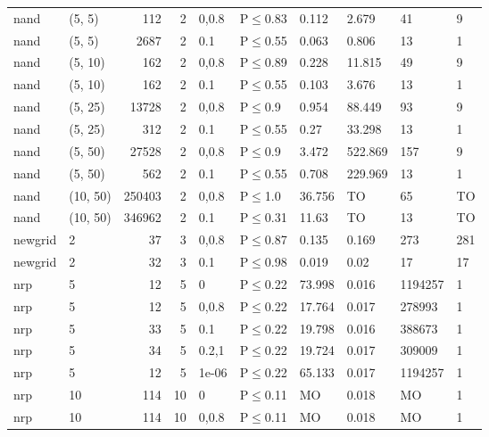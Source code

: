 \begin{longtable}{llrrllllll}
 nand          & (5, 5)   &    	112 &   2 & 0,0.8 & P$\leq$0.83  & 0.112  & 2.679   & 41      & 9    \\
 nand          & (5, 5)   &   	2687 &   2 & 0.1   & P$\leq$0.55  & 0.063  & 0.806   & 13      & 1    \\
 nand          & (5, 10)  &    	162 &   2 & 0,0.8 & P$\leq$0.89  & 0.228  & 11.815  & 49      & 9    \\
 nand          & (5, 10)  &    	162 &   2 & 0.1   & P$\leq$0.55  & 0.103  & 3.676   & 13      & 1    \\
 nand          & (5, 25)  &  	13728 &   2 & 0,0.8 & P$\leq$0.9   & 0.954  & 88.449  & 93      & 9    \\
 nand          & (5, 25)  &    	312 &   2 & 0.1   & P$\leq$0.55  & 0.27   & 33.298  & 13      & 1    \\
 nand          & (5, 50)  &  	27528 &   2 & 0,0.8 & P$\leq$0.9   & 3.472  & 522.869 & 157     & 9    \\
 nand          & (5, 50)  &    	562 &   2 & 0.1   & P$\leq$0.55  & 0.708  & 229.969 & 13      & 1    \\
 nand          & (10, 50) & 	250403 &   2 & 0,0.8 & P$\leq$1.0   & 36.756 & TO      & 65      & TO   \\
 nand          & (10, 50) & 	346962 &   2 & 0.1   & P$\leq$0.31  & 11.63  & TO      & 13      & TO   \\
 newgrid       & 2        &     	37 &   3 & 0,0.8 & P$\leq$0.87  & 0.135  & 0.169   & 273     & 281  \\
 newgrid       & 2        &     	32 &   3 & 0.1   & P$\leq$0.98  & 0.019  & 0.02    & 17      & 17   \\
 nrp           & 5        &     	12 &   5 & 0     & P$\leq$0.22  & 73.998 & 0.016   & 1194257 & 1    \\
 nrp           & 5        &     	12 &   5 & 0,0.8 & P$\leq$0.22  & 17.764 & 0.017   & 278993  & 1    \\
 nrp           & 5        &     	33 &   5 & 0.1   & P$\leq$0.22  & 19.798 & 0.016   & 388673  & 1    \\
 nrp           & 5        &     	34 &   5 & 0.2,1 & P$\leq$0.22  & 19.724 & 0.017   & 309009  & 1    \\
 nrp           & 5        &     	12 &   5 & 1e-06 & P$\leq$0.22  & 65.133 & 0.017   & 1194257 & 1    \\
 nrp           & 10       &    	114 &  10 & 0     & P$\leq$0.11  & MO     & 0.018   & MO      & 1    \\
 nrp           & 10       &    	114 &  10 & 0,0.8 & P$\leq$0.11  & MO     & 0.018   & MO      & 1    \\

\end{longtable}

